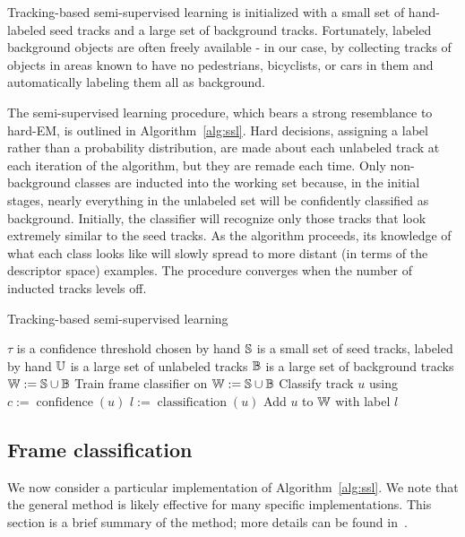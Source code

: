 \documentclass[conference]{IEEEtran}
\begin{document}
Tracking-based semi-supervised learning is initialized with a small set of hand-labeled seed tracks and a large set of background tracks.  Fortunately, labeled background objects are often freely available - in our case, by collecting tracks of objects in areas known to have no pedestrians, bicyclists, or cars in them and automatically labeling them all as background.  

The semi-supervised learning procedure, which bears a strong resemblance to hard-EM, is outlined in Algorithm~\ref{alg:ssl}.  Hard decisions, \ie assigning a label rather than a probability distribution, are made about each unlabeled track at each iteration of the algorithm, but they are remade each time.  Only non-background classes are inducted into the working set \W because, in the initial stages, nearly everything in the unlabeled set will be confidently classified as background.  Initially, the classifier will recognize only those tracks that look extremely similar to the seed tracks.  As the algorithm proceeds, its knowledge of what each class looks like will slowly spread to more distant (in terms of the descriptor space) examples.  The procedure converges when the number of inducted tracks levels off.


\begin{algorithm}[h]
  \caption{Tracking-based semi-supervised learning}
  \label{alg:ssl}
  \begin{algorithmic}
    \STATE $\tau$ is a confidence threshold chosen by hand
    \STATE $\S$ is a small set of seed tracks, labeled by hand
    \STATE $\U$ is a large set of unlabeled tracks
    \STATE $\B$ is a large set of background tracks
    \STATE
    \STATE $\W := \S \cup \B$
    \REPEAT
    \STATE Train frame classifier \C on \W
    \STATE $\W := \S \cup \B$
    \STATE Classify track $u$ using \C
    \STATE $c := \operatorname{confidence}(u)$
    \STATE $l := \operatorname{classification}(u)$
    \STATE Add $u$ to $\W$ with label $l$
    \ENDIF
    \ENDFOR
  \end{algorithmic}
\end{algorithm}


\subsection{Frame classification}
\label{sec:boosting}

We now consider a particular implementation of Algorithm~\ref{alg:ssl}.  We note that the general method is likely effective for many specific implementations.  This section is a brief summary of the method; more details can be found in~\cite{Teichman2011}.
\end{document}
